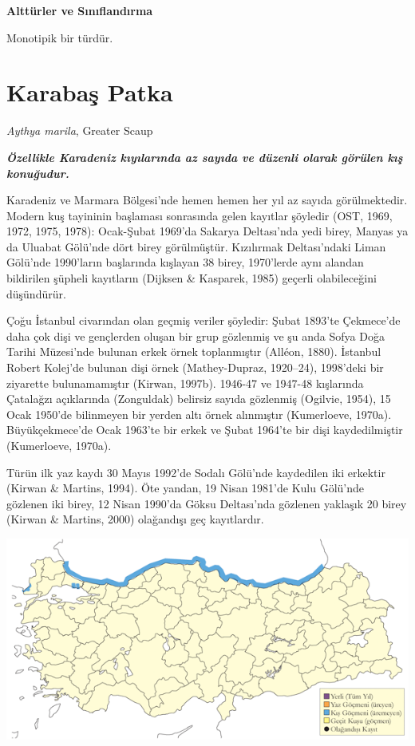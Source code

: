\documentclass[
  a4paper,
  DIV=11,
  numbers=noendperiod]{scrreprt}
\begin{document}
\textbf{Alttürler ve Sınıflandırma}

Monotipik bir türdür.

\section{Karabaş Patka}\label{karabaux15f-patka}

\emph{Aythya marila}, Greater Scaup

\textbf{\emph{Özellikle Karadeniz kıyılarında az sayıda ve düzenli
olarak görülen kış konuğudur.}}

Karadeniz ve Marmara Bölgesi'nde hemen hemen her yıl az sayıda
görülmektedir. Modern kuş tayininin başlaması sonrasında gelen kayıtlar
şöyledir (OST, 1969, 1972, 1975, 1978): Ocak-Şubat 1969'da Sakarya
Deltası'nda yedi birey, Manyas ya da Uluabat Gölü'nde dört birey
görülmüştür. Kızılırmak Deltası'ndaki Liman Gölü'nde 1990'ların
başlarında kışlayan 38 birey, 1970'lerde aynı alandan bildirilen şüpheli
kayıtların (Dijksen \& Kasparek, 1985) geçerli olabileceğini düşündürür.

Çoğu İstanbul civarından olan geçmiş veriler şöyledir: Şubat 1893'te
Çekmece'de daha çok dişi ve gençlerden oluşan bir grup gözlenmiş ve şu
anda Sofya Doğa Tarihi Müzesi'nde bulunan erkek örnek toplanmıştır
(Alléon, 1880). İstanbul Robert Kolej'de bulunan dişi örnek
(Mathey-Dupraz, 1920--24), 1998'deki bir ziyarette bulunamamıştır
(Kirwan, 1997b). 1946-47 ve 1947-48 kışlarında Çatalağzı açıklarında
(Zonguldak) belirsiz sayıda gözlenmiş (Ogilvie, 1954), 15 Ocak 1950'de
bilinmeyen bir yerden altı örnek alınmıştır (Kumerloeve, 1970a).
Büyükçekmece'de Ocak 1963'te bir erkek ve Şubat 1964'te bir dişi
kaydedilmiştir (Kumerloeve, 1970a).

Türün ilk yaz kaydı 30 Mayıs 1992'de Sodalı Gölü'nde kaydedilen iki
erkektir (Kirwan \& Martins, 1994). Öte yandan, 19 Nisan 1981'de Kulu
Gölü'nde gözlenen iki birey, 12 Nisan 1990'da Göksu Deltası'nda gözlenen
yaklaşık 20 birey (Kirwan \& Martins, 2000) olağandışı geç kayıtlardır.

\includegraphics{images/harita_Page_026.png}
\end{document}
